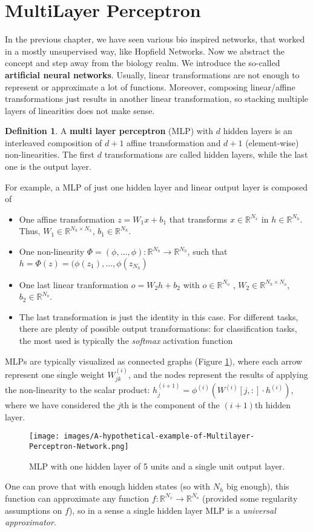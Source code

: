 \documentclass[oneside]{book}
\newcommand{\R}{\mathbb{R}}
\theoremstyle{definition}
\newtheorem{defn}{Definition}
\theoremstyle{plain}
\begin{document}
\section{MultiLayer Perceptron}
In the previous chapter, we have seen various bio inspired networks, that worked in a mostly unsupervised way, like Hopfield Networks.
Now we abstract the concept and step away from the biology realm. We introduce the so-called \textbf{artificial neural networks}. Usually, linear transformations are not enough to represent or approximate a lot of functions. Moreover, composing linear/affine transformations just results in another linear transformation, so stacking multiple layers of linearities does not make sense.
\begin{defn}
   A \textbf{multi layer perceptron } (MLP)  with $d$ hidden layers is an interleaved composition of $d+1$ affine transformation  and $d+1$ (element-wise) non-linearities. The first $d$ transformations are called hidden layers, while the last one is the output layer.
\end{defn}
For example, a MLP of just one hidden layer and linear output layer is composed of
\begin{itemize}
    \item One affine transformation $z= W_1x + b_1$ that transforms $x\in \R^{N_x}$  in $h\in \R^{N_h}$. Thus, $W_1\in\R^{N_{h}\times N_x}$, $b_1\in \R^{N_h}$.
    \item     One non-linearity $\Phi =(\phi, \dots, \phi):\R^{N_h}\to \R^{N_h}$, such that $h=\Phi(z)=(\phi(z_1),...,\phi(z_{N_h})$ 
    \item One last linear tranformation $o=W_2h+ b_2$ with $o\in \R^{N_o}$ , $W_2\in \R^{N_h\times N_o}$, $b_2\in \R^{N_o}$. 
    \item The last transformation is just the identity in this case. For different tasks, there are plenty of possible output transformations: for classification tasks, the most used is typically the \textit{softmax} activation function
\end{itemize}

MLPs are typically visualized as connected graphs (Figure \ref{fig:mlp}), where each arrow represent one single weight $W^{(i)}_{jk}$, and the nodes represent the results of applying the non-linearity to the scalar product:  $h^{(i+1)}_j=\phi^{(i)}\left(W^{(i)}[j,:] \cdot h^{(i)}\right)$, where we have considered the $j$th is the component of the $(i+1)$th hidden layer.
\begin{figure}
    \centering
    \texttt{[image: images/A-hypothetical-example-of-Multilayer-Perceptron-Network.png]}
    \caption{MLP with one hidden layer of 5 units and a single unit output layer.}
    \label{fig:mlp}
\end{figure}
One can prove that with enough hidden states (so with $N_h$ big enough), this function can approximate any function $f:\R^{N_x}\to \R^{N_o}$ (provided some regularity assumptions on $f$), so in a sense a single hidden layer MLP is a \textit{universal approximator}. 
\end{document}
